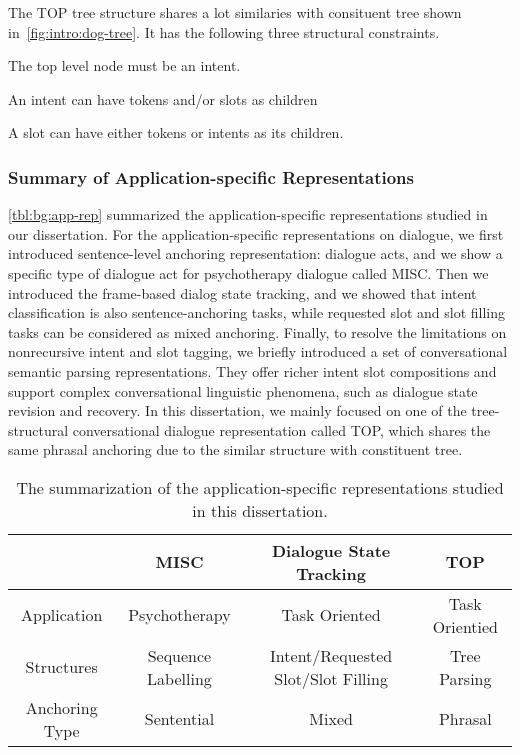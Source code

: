 The TOP tree structure shares a lot similaries with consituent tree
shown in~\autoref{fig:intro:dog-tree}. It has the following three structural
constraints.
\begin{inparaenum}[(1)]
\item The top level node must be an intent.
\item An intent can have tokens and/or slots as children
\item A slot can have either tokens or intents as its children.
\end{inparaenum}

\subsubsection{Summary of Application-specific Representations}
\label{ssec:bg:summary-application-rep}
\autoref{tbl:bg:app-rep} summarized the application-specific
representations studied in our dissertation. For the application-specific
representations on dialogue, we first introduced sentence-level
anchoring representation: dialogue acts, and we show a specific type
of dialogue act for psychotherapy dialogue called MISC. Then we
introduced the frame-based dialog state tracking, and we showed that
intent classification is also sentence-anchoring tasks, while
requested slot and slot filling tasks can be considered as mixed
anchoring. Finally, to resolve the limitations on nonrecursive intent
and slot tagging, we briefly introduced a set of conversational
semantic parsing representations. They offer richer intent slot
compositions and support complex conversational linguistic phenomena,
such as dialogue state revision and recovery.  In this dissertation, we
mainly focused on one of the tree-structural conversational dialogue
representation called TOP, which shares the same phrasal anchoring due
to the similar structure with constituent tree.

\begin{table}[!tbp]
\caption{The summarization of the application-specific representations studied in this dissertation.}
\label{tbl:bg:app-rep}
  \begin{center}
\setlength{\tabcolsep}{4pt}
{\small
\begin{tabular}{c|c|c|c}
  \toprule
  \hline
  & {\bf MISC}               & {\bf Dialogue State Tracking}            & {\bf TOP}            \\ \hline
  Application    & Psychotherapy      & Task Oriented                      & Task Orientied \\
  Structures     & Sequence Labelling & Intent/Requested Slot/Slot Filling & Tree Parsing   \\
  Anchoring Type & Sentential         & Mixed                              & Phrasal        \\
  \hline
  \bottomrule

\end{tabular}}
\end{center}
\label{tbl:bg:app-rep}
\end{table}



